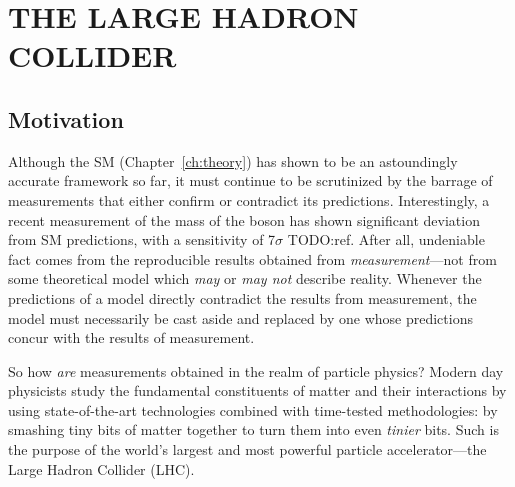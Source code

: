 \chapter{THE LARGE HADRON COLLIDER}
\label{ch:lhc}

\section{Motivation}
Although the SM (Chapter~\ref{ch:theory}) has shown to be an astoundingly accurate framework so far, it must continue to be scrutinized by the barrage of measurements that either confirm or contradict its predictions.
Interestingly, a recent measurement of the mass of the \PW boson has shown significant deviation from SM predictions, with a sensitivity of 7$\sigma$ TODO:ref.
After all, undeniable fact comes from the reproducible results obtained from \emph{measurement}---not from some theoretical model which \emph{may} or \emph{may not} describe reality.
Whenever the predictions of a model directly contradict the results from measurement, the model must necessarily be cast aside and replaced by one whose predictions concur with the results of measurement.

So how \emph{are} measurements obtained in the realm of particle physics?
Modern day physicists study the fundamental constituents of matter and their interactions by using state-of-the-art technologies combined with time-tested methodologies:
by smashing tiny bits of matter together to turn them into even \emph{tinier} bits.
Such is the purpose of the world's largest and most powerful particle accelerator---the Large Hadron Collider (LHC).


